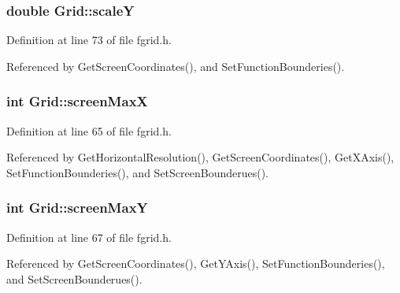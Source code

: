 \subsubsection[{\texorpdfstring{scaleY}{scaleY}}]{\setlength{\rightskip}{0pt plus 5cm}double Grid\+::scaleY\hspace{0.3cm}{\ttfamily [private]}}\hypertarget{classGrid_ab973a5a172794c1e8d87f2cad3f7cea9}{}\label{classGrid_ab973a5a172794c1e8d87f2cad3f7cea9}


Definition at line 73 of file fgrid.\+h.



Referenced by Get\+Screen\+Coordinates(), and Set\+Function\+Bounderies().

\subsubsection[{\texorpdfstring{screen\+MaxX}{screenMaxX}}]{\setlength{\rightskip}{0pt plus 5cm}int Grid\+::screen\+MaxX\hspace{0.3cm}{\ttfamily [private]}}\hypertarget{classGrid_ad662ef34930a80011080a45a975cae79}{}\label{classGrid_ad662ef34930a80011080a45a975cae79}


Definition at line 65 of file fgrid.\+h.



Referenced by Get\+Horizontal\+Resolution(), Get\+Screen\+Coordinates(), Get\+X\+Axis(), Set\+Function\+Bounderies(), and Set\+Screen\+Bounderues().

\subsubsection[{\texorpdfstring{screen\+MaxY}{screenMaxY}}]{\setlength{\rightskip}{0pt plus 5cm}int Grid\+::screen\+MaxY\hspace{0.3cm}{\ttfamily [private]}}\hypertarget{classGrid_a9ff802b20cf95e066646d24aa284a547}{}\label{classGrid_a9ff802b20cf95e066646d24aa284a547}


Definition at line 67 of file fgrid.\+h.



Referenced by Get\+Screen\+Coordinates(), Get\+Y\+Axis(), Set\+Function\+Bounderies(), and Set\+Screen\+Bounderues().


